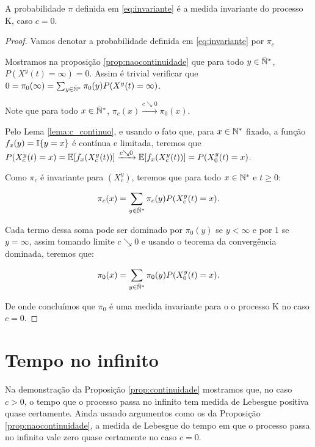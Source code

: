 \begin{proposicao}
  A probabilidade $\pi$ definida em \eqref{eq:invariante} é a medida
  invariante do processo K, caso $c = 0$.
\end{proposicao}
\begin{proof}

  Vamos denotar a probabilidade definida em \eqref{eq:invariante} por
  $\pi_c$

  Mostramos na proposição \ref{prop:naocontinuidade} que para todo $y
  \in {\mathbb{\bar{N}^*}}$, $P(X^y(t) = \infty) = 0$. Assim é trivial verificar que
  $0 = \pi_0(\infty) = \sum_{y\in{\mathbb{\bar{N}^*}}} \pi_0(y) P(X^y(t) =
  \infty)$.

  Note que para todo $x \in {\mathbb{\bar{N}^*}}$, $\pi_c(x) \xrightarrow{c\searrow0}
  \pi_0(x)$.

  Pelo Lema \ref{lema:c_continuo}, e usando o fato que, para $x \in
  {\mathbb{N^*}}$ fixado, a função $f_x(y) = {\mathbb{I}}\{y = x\}$ é contínua e
  limitada, teremos que $P(X^y_c (t) = x) = {\mathbb{E}} [f_x(X^y_c(t))]
  \xrightarrow{c\searrow0} {\mathbb{E}} [f_x(X^y_c(t))] = P(X^y_0(t) = x)$.

  Como $\pi_c$ é invariante para $(X^y_c)$, teremos que para todo $x
  \in {\mathbb{N^*}}$ e $t \geq 0$:

  \begin{align*}
    \pi_c(x) &= \sum_{y \in {\mathbb{\bar{N}^*}}} \pi_c (y) P(X^y_c (t) = x).\\
  \end{align*}

  Cada termo dessa soma pode ser dominado por $\pi_0(y)$ se $y <
  \infty$ e por $1$ se $y = \infty$, assim tomando limite $c\searrow0$
  e usando o teorema da convergência dominada, teremos que:

  \begin{align*}
    \pi_0(x) &= \sum_{y \in {\mathbb{\bar{N}^*}}} \pi_0 (y) P(X^y_0 (t) = x).\\
  \end{align*}

  De onde concluímos que $\pi_0$ é uma medida invariante para o o
  processo K no caso $c = 0$.
\end{proof}


\section{Tempo no infinito}
\label{sec:tempo-infinito}

Na demonstração da Proposição \ref{prop:continuidade} mostramos que,
no caso $c > 0$, o tempo que o processo passa no infinito tem medida
de Lebesgue positiva quase certamente. Ainda usando argumentos como os
da Proposição \ref{prop:naocontinuidade}, a medida de Lebesgue do
tempo em que o processo passa no infinito vale zero quase certamente
no caso $c = 0$.

